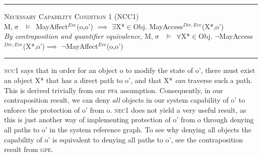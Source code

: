 \documentclass[a4paper,11pt, twoside,twocolumn]{article}
\newenvironment{logic}[1][]
{\begin{flushleft} \small }
{\end{flushleft}}
\newcommand{\loin}{$\in$}
\newcommand{\loforall}{$\forall$}
\newcommand{\loexists}{$\exists$}
\newcommand{\loimplies}{$\implies$}
\newcommand{\losigma}{$\upsigma$}
\newcommand{\loturns} {$\vDash$}
\newcommand{\loneg}{$\boldsymbol \neg$}
\newcommand{\ablock} {\null\qquad}
\begin{document}
\begin{logic}
\hrule\null
\textsc{\normalsize *Necessary Capability Condition 1 (NCC1)}\\
M,\losigma\ \loturns\ MayAffect$^{Eve}$(o,o') \loimplies\linebreak
	\ablock \loexists X*\loin{Obj}. MayAccess$^{Dir,Eve}$(X*,o') 
\linebreak\\
\textit{By contraposition and quantifier equivalence,}\linebreak
M,\losigma\ \loturns\ \loforall X*\loin{Obj}. \loneg MayAccess$^{Dir,Eve}$(X*,o')\loimplies\linebreak
	\ablock \loneg MayAffect$^{Eve}$(o,o') \linebreak
\hrule
\end{logic}
\textsc{ncc1} says that in order for an object o to modify the state of o', there must exist an object X* that has a direct path to o', and that X* \textit{can} traverse such a path. This is derived trivially from our \textsc{pfa} assumption. Consequently, in our contraposition result, we can deny \textit{all} objects in our system capability of o' to enforce the protection of o' from o. \textsc{nec1} does not yield a very useful result, as this is just another way of implementing protection of o' from o through denying all paths to o' in the system reference graph. To see why denying all objects the capability of o' is equivalent to denying all paths to o', see the contraposition result from \textsc{gpe}.\\
\end{document}
